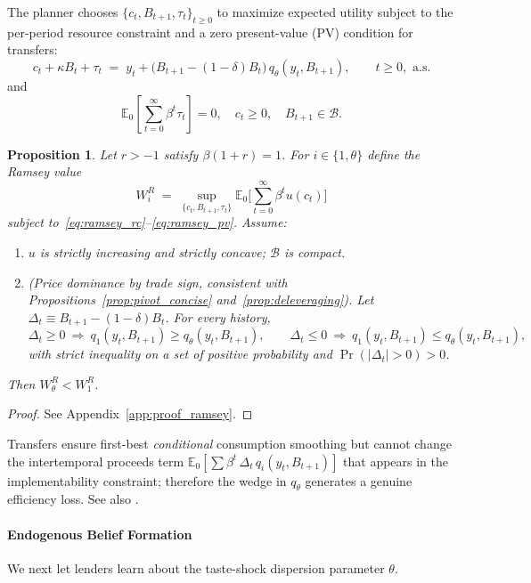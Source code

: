 \documentclass[12pt]{article}
\theoremstyle{plain}
\newtheorem{proposition}{Proposition}
\newcommand{\E}{\mathbb{E}}
\begin{document}
The planner chooses $\{c_t,B_{t+1},\tau_t\}_{t\ge0}$ to maximize expected
utility subject to the per-period resource constraint and a zero present-value
(PV) condition for transfers:
\begin{equation}
	c_t+\kappa B_t+\tau_t \;=\; y_t+\bigl(B_{t+1}-(1-\delta)B_t\bigr)\,q_\theta(y_t,B_{t+1}),
	\qquad t\ge0, \text{ a.s.}
	\label{eq:ramsey_rc}
\end{equation}
and
\begin{equation}
	\E_0\!\left[\sum_{t=0}^\infty \beta^t \tau_t\right]=0,
	\quad c_t\ge0,
	\quad B_{t+1}\in\mathcal B.
	\label{eq:ramsey_pv}
\end{equation}

\begin{proposition}
	\label{prop:ramsey_welfare}
	Let $r>-1$ satisfy $\beta(1+r)=1$. For $i\in\{1,\theta\}$ define the Ramsey value
	\[
		W^R_i \;=\; \sup_{\{c_t,B_{t+1},\tau_t\}}\E_0\!\Big[\sum_{t=0}^\infty \beta^t u(c_t)\Big]
	\]
	subject to~\eqref{eq:ramsey_rc}--\eqref{eq:ramsey_pv}. Assume:
	\begin{enumerate}
		\item[(A1)] $u$ is strictly increasing and strictly concave; $\mathcal B$ is compact.
		\item[(A2)] (Price dominance by trade sign, consistent with Propositions~\ref{prop:pivot_concise} and~\ref{prop:deleveraging}). Let $\Delta_t\equiv B_{t+1}-(1-\delta)B_t$. For every history,
		      \[
			      \Delta_t\ge0 \ \Rightarrow\ q_1(y_t,B_{t+1})\ge q_\theta(y_t,B_{t+1}),\qquad
			      \Delta_t\le0 \ \Rightarrow\ q_1(y_t,B_{t+1})\le q_\theta(y_t,B_{t+1}),
		      \]
		      with strict inequality on a set of positive probability and
		      $\Pr(|\Delta_t|>0)>0$.
	\end{enumerate}
	Then $W^R_\theta<W^R_1$.
\end{proposition}

\begin{proof}
	See Appendix~\ref{app:proof_ramsey}.
\end{proof}

Transfers ensure first-best \emph{conditional} consumption smoothing but cannot
change the intertemporal proceeds term $\E_0[\sum
	\beta^t\,\Delta_t\,q_i(y_t,B_{t+1})]$ that appears in the implementability
constraint; therefore the wedge in $q_\theta$ generates a genuine efficiency
loss. See also \citep{AiyagariMarcetSargentSeppala2002}.

\paragraph{Endogenous Belief Formation}
We next let lenders learn about the taste-shock dispersion parameter $\theta$.
\end{document}
